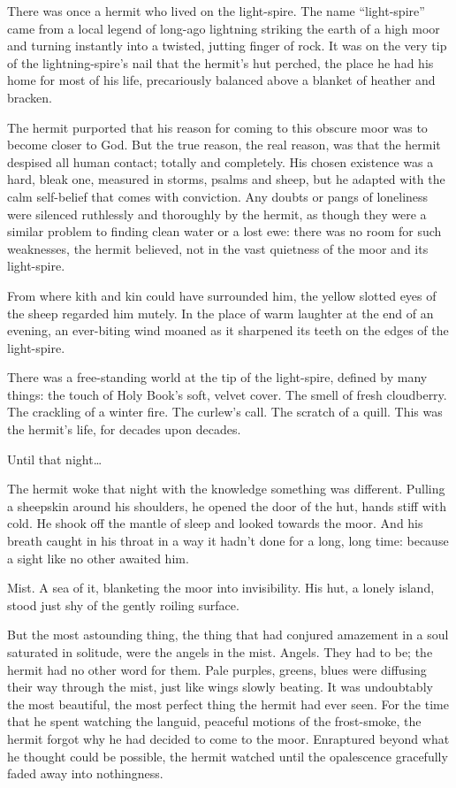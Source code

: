 There was once a hermit who lived on the light-spire. The name “light-spire” came from a local legend of long-ago lightning striking the earth of a high moor and turning instantly into a twisted, jutting finger of rock. It was on the very tip of the lightning-spire’s nail that the hermit’s hut perched, the place he had his home for most of his life, precariously balanced above a blanket of heather and bracken. 

The hermit purported that his reason for coming to this obscure moor was to become closer to God. But the true reason, the real reason, was that the hermit despised all human contact; totally and completely. His chosen existence was a hard, bleak one, measured in storms, psalms and sheep, but he adapted with the calm self-belief that comes with conviction. Any doubts or pangs of loneliness were silenced ruthlessly and thoroughly by the hermit, as though they were a similar problem to finding clean water or a lost ewe: there was no room for such weaknesses, the hermit believed, not in the vast quietness of the moor and its light-spire. 

From where kith and kin could have surrounded him, the yellow slotted eyes of the sheep regarded him mutely. In the place of warm laughter at the end of an evening, an ever-biting wind moaned as it sharpened its teeth on the edges of the light-spire. 

There was a free-standing world at the tip of the light-spire, defined by many things: the touch of Holy Book’s soft, velvet cover. The smell of fresh cloudberry. The crackling of a winter fire. The curlew’s call. The scratch of a quill. This was the hermit’s life, for decades upon decades. 

Until that night… 

The hermit woke that night with the knowledge something was different. Pulling a sheepskin around his shoulders, he opened the door of the hut, hands stiff with cold. He shook off the mantle of sleep and looked towards the moor. And his breath caught in his throat in a way it hadn’t done for a long, long time: because a sight like no other awaited him. 

Mist. A sea of it, blanketing the moor into invisibility. His hut, a lonely island, stood just shy of the gently roiling surface. 

But the most astounding thing, the thing that had conjured amazement in a soul saturated in solitude, were the angels in the mist. Angels. They had to be; the hermit had no other word for them. Pale purples, greens, blues were diffusing their way through the mist, just like wings slowly beating. It was undoubtably the most beautiful, the most perfect thing the hermit had ever seen. For the time that he spent watching the languid, peaceful motions of the frost-smoke, the hermit forgot why he had decided to come to the moor. Enraptured beyond what he thought could be possible, the hermit watched until the opalescence gracefully faded away into nothingness. 

